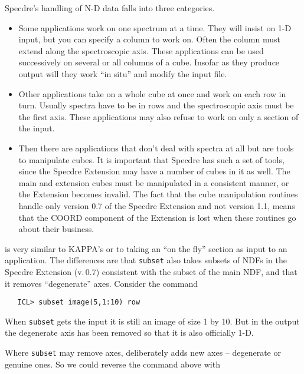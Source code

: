    Specdre's handling of N-D data falls into three categories.

\begin{itemize}
\item Some applications work on one spectrum at a time.  They will
   insist on 1-D input, but you can specify a column to work on.  Often
   the column must extend along the spectroscopic axis.  These
   applications can be used successively on several or all columns of a
   cube.  Insofar as they produce output will they work ``in situ'' and
   modify the input file.

\item Other applications take on a whole cube at once and work on each
   row in turn.  Usually spectra have to be in rows and the
   spectroscopic axis must be the first axis.  These applications may
   also refuse to work on only a section of the input.

\item Then there are applications that don't deal with spectra at all
   but are tools to manipulate cubes.  It is important that Specdre has
   such a set of tools, since the Specdre Extension may have a number of
   cubes in it as well.  The main and extension cubes must be
   manipulated in a consistent manner, or the Extension becomes invalid.
   The fact that the cube manipulation routines handle only version 0.7
   of the Specdre Extension and not version 1.1, means that the COORD
   component of the Extension is lost when these routines go about their
   business.
\end{itemize}

{\tt{}}
   is very similar to KAPPA's
{\tt{}}
   or to taking an ``on the fly'' section as input to an application.
   The differences are that {\tt subset} also takes subsets of NDFs in
   the Specdre Extension (v.\,0.7) consistent with the subset of the
   main NDF, and that it removes ``degenerate'' axes.  Consider the
   command

\begin{verbatim}
   ICL> subset image(5,1:10) row
\end{verbatim}

   When {\tt subset} gets the input it is still an image of size 1 by
   10.  But in the output the degenerate axis has been removed so that
   it is also officially 1-D.

   Where {\tt subset} may remove axes,
{\tt{}}
   deliberately adds new axes -- degenerate or genuine ones.  So we
   could reverse the command above with

